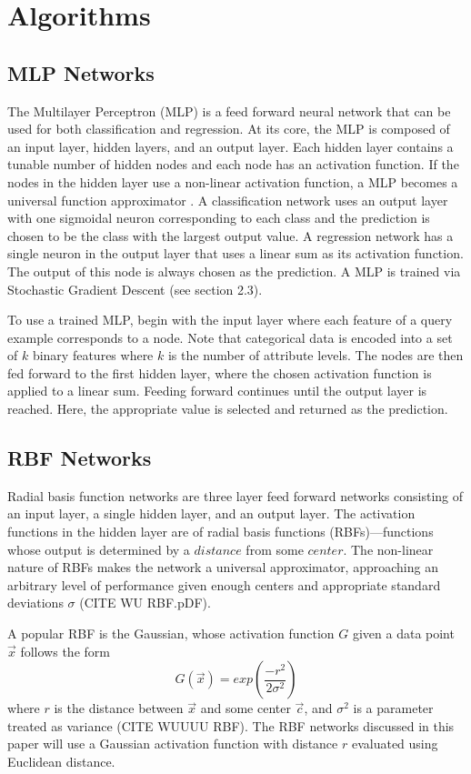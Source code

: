\documentclass[twoside,11pt]{article}
\begin{document}
\section{Algorithms}

\subsection{MLP Networks}
The Multilayer Perceptron (MLP) is a feed forward neural network that can be used for both classification and regression.
At its core, the MLP is composed of an input layer, hidden layers, and an output layer. Each hidden layer contains a tunable number of hidden nodes and each node has an activation function. If the nodes in the hidden layer use a non-linear activation function, a MLP becomes a universal function approximator \citep{svozil1997ffnn}.
A classification network uses an output layer with one sigmoidal neuron corresponding to each class and the prediction is chosen to be the class with the largest output value. A regression network has a single neuron in the output layer that uses a linear sum as its activation function. The output of this node is always chosen as the prediction.
A MLP is trained via Stochastic Gradient Descent (see section 2.3).

To use a trained MLP, begin with the input layer where each feature of a query example corresponds to a node. Note that categorical data is encoded into a set of $k$ binary features where $k$ is the number of attribute levels.
The nodes are then fed forward to the first hidden layer, where the chosen activation function is applied to a linear sum. Feeding forward continues until the output layer is reached. Here, the appropriate value is selected and returned as the prediction.

\subsection{RBF Networks}
	Radial basis function networks are three layer feed forward networks consisting of an input layer, a single hidden layer, and an output layer. The activation functions in the hidden layer are of radial basis functions (RBFs)---functions whose output is determined by a $distance$ from some $center$. The non-linear nature of RBFs makes the network a universal approximator, approaching an arbitrary level of performance given enough centers and appropriate standard deviations $\sigma$ (CITE WU RBF.pDF). %

	A popular RBF is the Gaussian, whose activation function $G$ given a data point $\vec{x}$ follows the form
	$$G(\vec{x}) = exp({\frac{-r^2}{2\sigma^2}})$$
	where $r$ is the distance between $\vec x$ and some center $\vec c$, and $\sigma^2$ is a parameter treated as variance (CITE WUUUU RBF). The RBF networks discussed in this paper will use a Gaussian activation function with distance $r$ evaluated using Euclidean distance.
\end{document}
